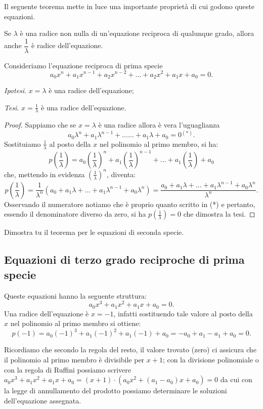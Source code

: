 Il seguente teorema mette in luce una importante proprietà di cui godono queste equazioni.
\begin{teorema}
Se $\lambda $ è una radice non nulla di un’equazione reciproca di qualunque grado, allora anche $\dfrac 1{\lambda }$ è radice dell’equazione.
\end{teorema}

Consideriamo l'equazione reciproca di prima specie \[a_0x^n+a_1x^{n-1}+a_2x^{n-2}+ \ldots +a_2x^2+a_1x+a_0=0.\]

\emph{Ipotesi}. $x=\lambda $ è una radice dell’equazione;

\emph{Tesi}. $x=\frac 1{\lambda }$ è una radice dell’equazione.
\begin{proof}
Sappiamo che se $x=\lambda$ è una radice allora è vera l’uguaglianza
\[a_0\lambda ^n+a_1\lambda ^{n-1}+\ldots \ldots +a_1\lambda +a_0=0 {}^{(*)}.\]
Sostituiamo $\frac 1{\lambda }$ al posto della $x$ nel polinomio al primo membro, si ha:
\[p\left(\frac 1{\lambda }\right)=a_0\left(\frac 1{\lambda }\right)^n+a_1\left(\frac 1{\lambda }\right)^{n-1}+\ldots +a_1\left(\frac 1{\lambda }\right)+a_0\]
che, mettendo in evidenza $ \left(\frac 1{\lambda }\right)^n $, diventa: \[p\left(\frac 1{\lambda }\right)=\frac 1{\lambda ^n} \left(a_0+a_1\lambda +\ldots +a_1\lambda ^{n-1}+a_0\lambda ^n \right)=\frac{a_0+a_1\lambda +\ldots +a_1\lambda ^{n-1}+a_0\lambda ^n}{\lambda ^n}.\]
Osservando il numeratore notiamo che è proprio quanto scritto in (*) e pertanto, essendo il denominatore diverso da zero, si ha $p\left(\frac 1{\lambda }\right)=0$ che dimostra la tesi.
\end{proof}
Dimostra tu il teorema per le equazioni di seconda specie.

\subsection{Equazioni di terzo grado reciproche di prima specie}
Queste equazioni hanno la seguente struttura: \[a_0x^3+a_1x^2+a_1x+a_0=0.\]
Una radice dell'equazione è $x=-1$, infatti sostituendo tale valore al posto della $ x $ nel polinomio al primo membro si ottiene: \[p(-1)=a_0(-1)^3+a_1(-1)^2+a_1(-1)+a_0=-a_0+a_1-a_1+a_0=0.\]

Ricordiamo che secondo la regola del resto, il valore trovato (zero) ci assicura che il polinomio al primo membro è divisibile per $x+1$; con la divisione polinomiale o con la regola di Ruffini possiamo scrivere $a_0x^3+a_1x^2+a_1x+a_0=(x+1)\cdot \left(a_0x^2+(a_1-a_0)x+a_0\right)=0$ da cui con la legge di annullamento del prodotto possiamo determinare le soluzioni dell’equazione assegnata.


